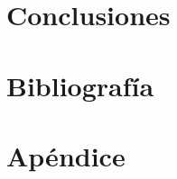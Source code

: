 \documentclass[a4paper,11pt]{book}
\begin{document}
\chapter{Conclusiones}

\chapter{Bibliografía}

\chapter{Apéndice}





%
%
%
%
%
%
%
%
%
%
%
%
%
%
%
%
%
%
%
%
%
%
\chapter*{}
\thispagestyle{empty}
\end{document}
